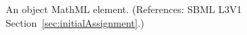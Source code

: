 An \InitialAssignment object  MathML 
element.  (References: SBML L3V1 Section~\ref{sec:initialAssignment}.)
